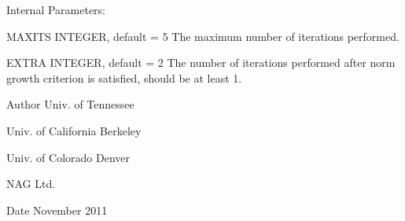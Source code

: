 \begin{DoxyParagraph}{Internal Parameters\+: }
\begin{DoxyVerb}  MAXITS  INTEGER, default = 5
          The maximum number of iterations performed.

  EXTRA   INTEGER, default = 2
          The number of iterations performed after norm growth
          criterion is satisfied, should be at least 1.\end{DoxyVerb}
 
\end{DoxyParagraph}
\begin{DoxyAuthor}{Author}
Univ. of Tennessee 

Univ. of California Berkeley 

Univ. of Colorado Denver 

N\+A\+G Ltd. 
\end{DoxyAuthor}
\begin{DoxyDate}{Date}
November 2011 
\end{DoxyDate}
